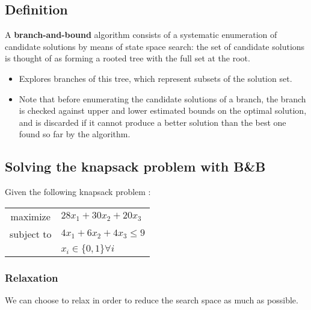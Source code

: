 
\subsection{Definition}

A \textbf{branch-and-bound} algorithm consists of a systematic enumeration of
candidate solutions by means of state space search: the set of candidate
solutions is thought of as forming a rooted tree with the full set at the root.

\begin{itemize}
    \item Explores branches of this tree, which represent subsets of the
solution set. 
    \item Note that before enumerating the candidate solutions of a branch, the
branch is checked against upper and lower estimated bounds on the optimal
solution, and is discarded if it cannot produce a better solution than the best
one found so far by the algorithm.
\end{itemize}

\subsection{Solving the knapsack problem with B\&B}

Given the following knapsack problem :
    \begin{tabular}{cl}
        maximize & $28x_1+30x_2 +20x_3$\\
        subject to & $4x_1+6x_2 +4x_3 \leq 9$\\
                   & $x_i \in \{0, 1\} \forall i$
    \end{tabular}

\subsubsection{Relaxation}
We can choose to relax in order to reduce the search space as much as possible.

